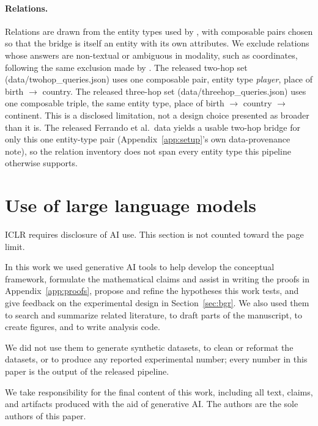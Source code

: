 \documentclass{article}
\newif\ifredflags
\newcommand{\rf}[1]{\ifredflags{\textcolor{red}{\textbf{[MISSING: #1]}}}\fi}
\newcommand{\lit}[1]{\textsf{\footnotesize #1}}
\begin{document}
\paragraph{Relations.} Relations are drawn from the entity types used by \citet{ferrando2025entity},
with composable pairs chosen so that the bridge is itself an entity with its own attributes. We
exclude relations whose answers are non-textual or ambiguous in modality, such as coordinates,
following the same exclusion made by \citet{tamoyan2025factual}. The released two-hop set
(\lit{data/twohop\_queries.json}) uses one composable pair, entity type \emph{player}, place of
birth $\to$ country. The released three-hop set (\lit{data/threehop\_queries.json}) uses one
composable triple, the same entity type, place of birth $\to$ country $\to$ continent. This is a
disclosed limitation, not a design choice presented as broader than it is. The released Ferrando et
al.\ data yields a usable two-hop bridge for only this one entity-type pair (Appendix~\ref{app:setup}'s
own data-provenance note), so the relation inventory does not span every entity type this pipeline
otherwise supports.

\section{Use of large language models}
\label{app:ai}

ICLR requires disclosure of AI use. This section is not counted toward the page limit.

In this work we used generative AI tools to help develop the conceptual framework, formulate the
mathematical claims and assist in writing the proofs in Appendix~\ref{app:proofs}, propose and refine
the hypotheses this work tests, and give feedback on the experimental design in
Section~\ref{sec:bgr}. We also used them to search and summarize related literature, to
draft parts of the manuscript, to create figures, and to write analysis code.

We did not use them to generate synthetic datasets, to clean or reformat the datasets, or to produce
any reported experimental number; every number in this paper is the output of the released pipeline.

We take responsibility for the final content of this work, including all text, claims, and artifacts
produced with the aid of generative AI. The authors are the sole authors of this paper.
\rf{this section currently cannot state that all AI-assisted work has been reviewed, because the
proofs in Appendix~\ref{app:proofs} carry an open human-verification flag. Complete that verification,
then restore the sentence ``We have reviewed all AI-assisted work'' together with a description of how
(for example, which authors re-derived the proofs and who re-ran the analysis code). Submitting with
the review sentence present while the proof flag is open would be a false statement under the ICLR
2027 AI policy.}
\end{document}
